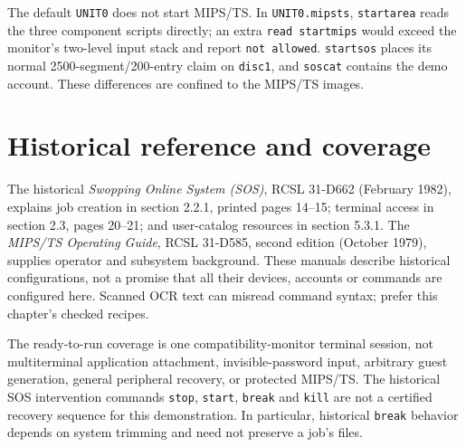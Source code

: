 The default \texttt{UNIT0} does not start MIPS/TS. In \texttt{UNIT0.mipsts},
\texttt{startarea} reads the three component scripts directly; an extra
\texttt{read startmips} would exceed the monitor's two-level input stack and
report \texttt{not allowed}. \texttt{startsos} places its normal
2500-segment/200-entry claim on \texttt{disc1}, and \texttt{soscat} contains
the demo account. These differences are confined to the MIPS/TS images.

\section{Historical reference and coverage}\label{mips-ts-reference}

The historical \emph{Swopping Online System (SOS)}, RCSL 31-D662
(February 1982), explains job creation in section 2.2.1, printed pages
14--15; terminal access in section 2.3, pages 20--21; and user-catalog
resources in section 5.3.1. The \emph{MIPS/TS Operating Guide}, RCSL
31-D585, second edition (October 1979), supplies operator and subsystem
background. These manuals describe historical configurations, not a promise
that all their devices, accounts or commands are configured here. Scanned
OCR text can misread command syntax; prefer this chapter's checked recipes.

The ready-to-run coverage is one compatibility-monitor terminal session,
not multiterminal application attachment, invisible-password input,
arbitrary guest generation, general peripheral recovery, or protected
MIPS/TS. The historical SOS intervention commands \texttt{stop},
\texttt{start}, \texttt{break} and \texttt{kill} are not a certified recovery
sequence for this demonstration. In particular, historical \texttt{break}
behavior depends on system trimming and need not preserve a job's files.
